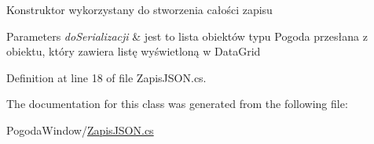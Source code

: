 Konstruktor wykorzystany do stworzenia całości zapisu 


\begin{DoxyParams}{Parameters}
{\em do\+Serializacji} & jest to lista obiektów typu Pogoda przesłana z obiektu, który zawiera listę wyświetloną w Data\+Grid\\
\hline
\end{DoxyParams}


Definition at line 18 of file Zapis\+J\+S\+O\+N.\+cs.



The documentation for this class was generated from the following file\+:\begin{DoxyCompactItemize}
\item 
Pogoda\+Window/\mbox{\hyperlink{_zapis_j_s_o_n_8cs}{Zapis\+J\+S\+O\+N.\+cs}}\end{DoxyCompactItemize}
